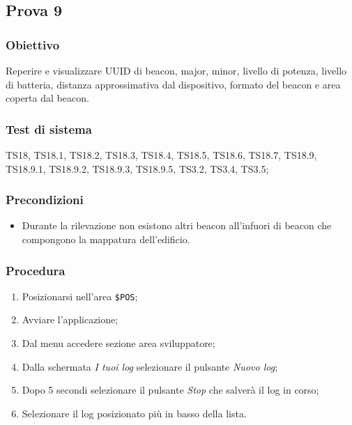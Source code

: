 \documentclass[../SperimentazioniPratiche.tex]{subfiles}
\begin{document}
\newpage	
\subsection{Prova 9} %
\label{subsec:Prova9}	
	
	\subsubsection{Obiettivo}
		Reperire e visualizzare UUID di beacon, major, minor, livello di potenza, livello di batteria, distanza approssimativa dal dispositivo, formato del beacon e area coperta dal beacon.
		
	\subsubsection{Test di sistema}
		TS18, TS18.1, TS18.2, TS18.3, TS18.4, TS18.5, TS18.6, TS18.7,
		TS18.9, TS18.9.1, TS18.9.2, TS18.9.3, TS18.9.5,
		TS3.2, TS3.4, TS3.5;
		
	\subsubsection{Precondizioni}
		\begin{itemize}
			\item Durante la rilevazione non esistono altri beacon all'infuori di beacon che compongono la mappatura dell'edificio.
		\end{itemize}				
		
	\subsubsection{Procedura}
		\begin{enumerate}
		\item Posizionarsi nell'area \verb|$POS|;
		\item Avviare l'applicazione;
		\item Dal menu accedere sezione area sviluppatore;
		\item Dalla schermata \textit{I tuoi log} selezionare il pulsante \textit{Nuovo log};
		\item Dopo 5 secondi selezionare il pulsante \textit{Stop}  che salverà il log in corso;
		\item Selezionare il log posizionato più in basso della lista.
		\end{enumerate}
		
\end{document}
